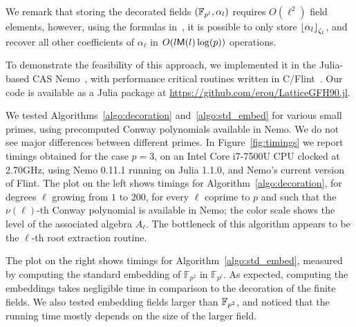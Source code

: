 \documentclass[sigconf]{acmart}
\begin{document}
We remark that storing the decorated fields $(\mathbb{F}_{p^l},\alpha_l)$
requires $O(\ell^2)$ field elements, however, using the formulas
in~\cite{Allombert02,brieulle2018computing}, it is possible to only
store $\left\lfloor \alpha_l \right\rfloor_{\zeta_l}$, and recover all other
coefficients of $\alpha_\ell$ in $O(l\mathsf{M}(l)\log(p))$ operations.

To demonstrate the feasibility of this approach, we implemented it in
the Julia-based CAS Nemo~\cite{Fieker:2017:NCA:3087604.3087611}, with
performance critical routines written in C/Flint~\cite{flint}. %
Our code is available as a Julia package at
\url{https://github.com/erou/LatticeGFH90.jl}.

We tested Algorithms~\ref{algo:decoration} and~\ref{algo:std_embed}
for various small primes, using precomputed Conway polynomials
available in Nemo. %
We do not see major differences between different primes. %
In Figure~\ref{fig:timings} we report timings obtained for the case
$p=3$, on an Intel Core i7-7500U CPU clocked at 2.70GHz, using Nemo
0.11.1 running on Julia 1.1.0, and Nemo's current version of Flint. %
The plot on the left shows timings for
Algorithm~\ref{algo:decoration}, for degrees $\ell$ growing from $1$
to $200$, for every $\ell$ coprime to $p$ and such that the
$\nu(\ell)$-th Conway polynomial is available in Nemo; the color scale
shows the level of the associated algebra $A_\ell$. %
The bottleneck of this algorithm appears to be the $\ell$-th root
extraction routine.

The plot on the right shows timings for
Algorithm~\ref{algo:std_embed}, measured by computing the standard
embedding of $\mathbb{F}_{p^2}$ in $\mathbb{F}_{p^\ell}$. %
As expected, computing the embeddings takes negligible time in
comparison to the decoration of the finite fields. %
We also tested embedding fields larger than $\mathbb{F}_{p^2}$, and noticed
that the running time mostly depends on the size of the larger field.
\end{document}
